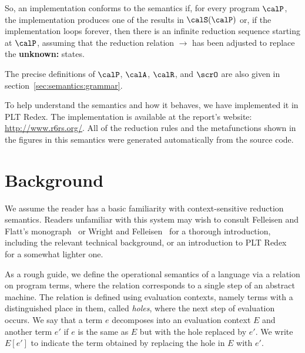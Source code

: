 So, an implementation conforms to the semantics if, for every program $\calP$, the implementation produces one of the results in $\calS(\calP)$ or, if the implementation loops forever, then there is an infinite reduction sequence starting at $\calP$, assuming that the reduction relation $\rightarrow$ has been adjusted to replace the \textbf{unknown:} states.

The precise definitions of $\calP$, $\calA$, $\calR$, and $\scrO$ are also given in section~\ref{sec:semantics:grammar}.

To help understand the semantics and how it behaves, we have
implemented it in PLT Redex. The implementation is available at the
report's website: \url{http://www.r6rs.org/}. All of the reduction
rules and the metafunctions shown in the figures in this semantics
were generated automatically from the source code.

\section{Background}

We assume the reader has a basic familiarity with context-sensitive
reduction semantics. Readers unfamiliar with this system may wish to
consult Felleisen and Flatt's monograph~\cite{ff:monograph} or Wright
and Felleisen~\cite{wf:type-soundness} for a thorough introduction,
including the relevant technical background, or an introduction to PLT
Redex~\cite{mfff:plt-redex} for a somewhat lighter one.

As a rough guide, we define the operational semantics of a language
via a relation on program terms, where the relation corresponds to a
single step of an abstract machine. The relation is defined using
evaluation contexts, namely terms with a distinguished place in them,
called \emph{holes}, where the next step of evaluation
occurs. We say that a term $e$ decomposes into an evaluation
context $E$ and another term $e'$ if $e$ is the
same as $E$ but with the hole replaced by $e'$. We write
$E[e']$ to indicate the term obtained by replacing the hole in
$E$ with $e'$.

